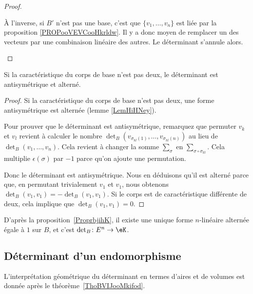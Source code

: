 \begin{proof}
\begin{subproof}
		À l'inverse, si \( B'\) n'est pas une base, c'est que \( \{ v_1,\ldots, v_n \}\) est liée par la proposition \ref{PROPooVEVCooHkrldw}. Il y a donc moyen de remplacer un des vecteurs par une combinaison linéaire des autres. Le déterminant s'annule alors.
	\end{subproof}
\end{proof}

\begin{proposition}     \label{PROPooXNLDooGGkHpd}
	Si la caractéristique du corps de base n'est pas deux, le déterminant est antisymétrique et alterné.
\end{proposition}

\begin{proof}
	Si la caractéristique du corps de base n'est pas deux, une forme antisymétrique est alternée (lemme \ref{LemHiHNey}).

    Pour prouver que le déterminant est antisymétrique, remarquez que permuter \( v_k\) et \( v_l\) revient à calculer le nombre \( \det_B( v_{\sigma_{kl}(1)},\ldots, v_{\sigma_{kl}(n)} )\) au lieu de \( \det_B(v_1,\ldots, v_n)\). Cela revient à changer la somme \( \sum_{\sigma}\) en \( \sum_{\sigma\circ\sigma_{kl}}\). Cela multiplie \( \epsilon(\sigma)\) par \( -1\) parce qu'on ajoute une permutation.

	Donc le déterminant est antisymétrique. Nous en déduisons qu'il est alterné parce que, en permutant trivialement \( v_1\) et \( v_1\), nous obtenons \( \det_B(v_1,v_1)=-\det_B(v_1,v_1)\). Si le corps est de caractéristique différente de deux, cela implique que \( \det_B(v_1,v_1)=0\).
\end{proof}

D'après la proposition~\ref{ProprbjihK}, il existe une unique forme \( n\)-linéaire alternée égale à \( 1\) sur \( B\), et c'est \( \det_B\colon E^n\to \eK\).

\subsection{Déterminant d'un endomorphisme}

L'interprétation géométrique du déterminant en termes d'aires et de volumes est donnée après le théorème~\ref{ThoBVIJooMkifod}.

